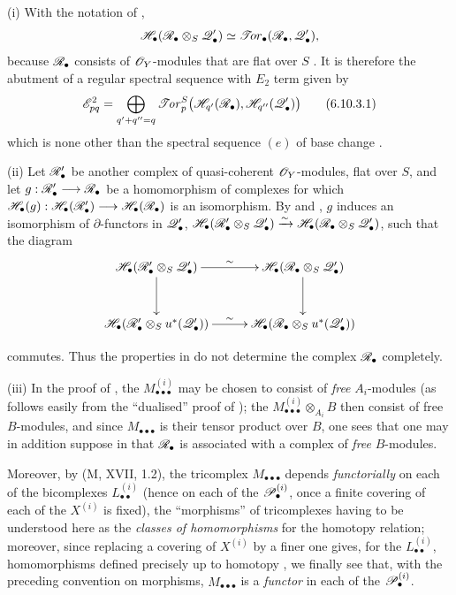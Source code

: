 \begin{remarks}[6.10.3]
\label{III.6.10.3}
\textnormal{(i)}
With the notation of ,
\[
  \mathscr{H}_\bullet
  (\mathscr{R}_\bullet\otimes_S\mathscr{Q}_\bullet')
  \simeq
  \mathscr{T}\!or_\bullet(\mathscr{R}_\bullet,\mathscr{Q}_\bullet'),
\]
because $\mathscr{R}_\bullet$ consists of $\mathscr{O}_Y$-modules that are
flat over $S$ .  It is therefore
 the abutment of a regular spectral sequence
with $E_2$ term given by
\[
  \mathscr{E}^2_{pq}
  =
  \bigoplus_{q'+q''=q}
  \mathscr{T}\!\mathit{or}_p^S
  \bigl(
    \mathscr{H}_{q'}(\mathscr{R}_\bullet),
    \mathscr{H}_{q''}(\mathscr{Q}_\bullet')
  \bigr)
  \tag{6.10.3.1}\label{III.6.10.3.1.eq}
\]
which is none other than the spectral sequence $(e)$ of base change
.

\medskip
\textnormal{(ii)}
Let $\mathscr{R}_\bullet'$ be another complex of quasi-coherent
$\mathscr{O}_Y$-modules, flat over $S$, and let $g:\mathscr{R}_\bullet'\longrightarrow\mathscr{R}_\bullet$
be a homomorphism of complexes for which $\mathscr{H}_\bullet(g):
\mathscr{H}_\bullet(\mathscr{R}_\bullet')
\longrightarrow
\mathscr{H}_\bullet(\mathscr{R}_\bullet)$
is an isomorphism.  By  and
, $g$ induces an isomorphism of
$\partial$-functors in $\mathscr{Q}_\bullet'$, $\mathscr{H}_\bullet
(\mathscr{R}_\bullet'\otimes_S\mathscr{Q}_\bullet')
\xrightarrow{\sim}
\mathscr{H}_\bullet
(\mathscr{R}_\bullet\otimes_S\mathscr{Q}_\bullet')$,
such that the diagram
\[
\xymatrix@C=28pt@R=30pt{
  \sh H_\bullet
  (\sh R_\bullet'\otimes_S\sh Q_\bullet')
  \ar[r]^-{\sim}\ar[d]
  &
  \sh H_\bullet
  (\sh R_\bullet\otimes_S\sh Q_\bullet')
  \ar[d]
  \\
  \sh H_\bullet
  (\sh R_\bullet'\otimes_Su^*(\sh Q_\bullet'))
  \ar[r]^-{\sim}
  &
  \sh H_\bullet
  (\sh R_\bullet\otimes_Su^*(\sh Q_\bullet'))
}
\]
\par\medskip\noindent
commutes.  Thus the properties in  do not
determine the complex $\mathscr{R}_\bullet$ completely.

\medskip
{}
\textnormal{(iii)}
In the proof of , the
$M_{\bullet\bullet\bullet}^{(i)}$ may be chosen to consist of
\emph{free} $A_i$-modules (as follows easily from the ``dualised''
proof of ); the $M_{\bullet\bullet\bullet}^{(i)}\otimes_{A_i}B$
then consist of free $B$-modules, and since
$M_{\bullet\bullet\bullet}$ is their tensor product over $B$,
one sees that one may in addition suppose in  that
$\mathscr{R}_\bullet$ is associated with a complex of \emph{free}
$B$-modules.

Moreover, by (M, XVII, 1.2), the tricomplex
$M_{\bullet\bullet\bullet}$ depends \emph{functorially} on each of the
bicomplexes $L_{\bullet\bullet}^{(i)}$ (hence on each of the
$\mathscr{P}_\bullet^{(i)}$, once a finite covering of each of the
$X^{(i)}$ is fixed), the ``morphisms'' of tricomplexes having to be
understood here as the \emph{classes of homomorphisms} for the homotopy relation;
moreover, since replacing a covering of $X^{(i)}$ by a finer one gives, for the
$L_{\bullet\bullet}^{(i)}$, homomorphisms defined precisely up to homotopy
, we finally see that, with the preceding convention on
morphisms, $M_{\bullet\bullet\bullet}$ is a \emph{functor} in each of the
$\mathscr{P}_\bullet^{(i)}$.


\end{remarks}
